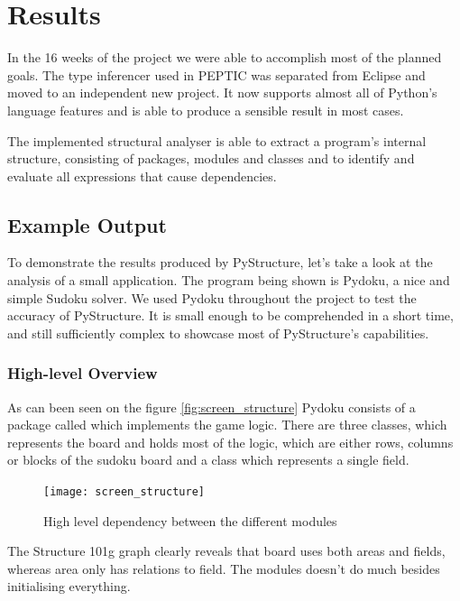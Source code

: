 \documentclass[12pt,halfparskip,DIV11,BCOR10mm]{scrreprt}
\begin{document}
\chapter{Results}

In the 16 weeks of the project we were able to accomplish most of the planned goals. The type inferencer used in PEPTIC\cite{peptic2} was separated from Eclipse and moved to an independent new project. It now supports almost all of Python's language features and is able to produce a sensible result in most cases.

The implemented structural analyser is able to extract a program's internal structure, consisting of packages, modules and classes and to identify and evaluate all expressions that cause dependencies.

\section{Example Output}

To demonstrate the results produced by PyStructure, let's take a look at the analysis of a small application. The program being shown is Pydoku, a nice and simple Sudoku solver. We used Pydoku throughout the project to test the accuracy of PyStructure. It is small enough to be comprehended in a short time, and still sufficiently complex to showcase most of PyStructure's capabilities.

\subsection{High-level Overview}

As can been seen on the figure \vref{fig:screen_structure} Pydoku consists of a package called  which implements the game logic. There are three classes,  which represents the board and holds most of the logic,  which are either rows, columns or blocks of the sudoku board and a class  which represents a single field.

\begin{figure}[H]
    \centering
    \texttt{[image: screen\_structure]}
    \caption{High level dependency between the different modules}
    \label{fig:screen_structure}
\end{figure}

The Structure 101g graph clearly reveals that board uses both areas and fields, whereas area only has relations to field. The  modules doesn't do much besides initialising everything.
\end{document}
